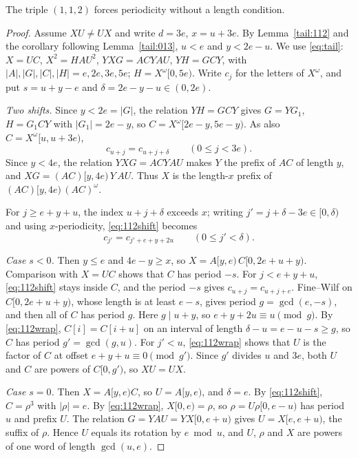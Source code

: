 \begin{theorem}\label{tail:112full}
The triple \((1,1,2)\) forces periodicity without a length condition.
\end{theorem}
\begin{proof}
Assume \(XU\ne UX\) and write \(d=3e\), \(x=u+3e\). By Lemma~\ref{tail:112} and the corollary following Lemma~\ref{tail:013}, \(u<e\) and \(y<2e-u\). We use \eqref{eq:tail}: \(X=UC\), \(X^2=HAU^2\), \(YXG=ACYAU\), \(YH=GCY\), with \(|A|,|G|,|C|,|H|=e,2e,3e,5e\); \(H=X^\omega[0,5e)\). Write \(c_j\) for the letters of \(X^\omega\), and put \(s=u+y-e\) and \(\delta=2e-y-u\in(0,2e)\).

\emph{Two shifts.} Since \(y<2e=|G|\), the relation \(YH=GCY\) gives \(G=YG_1\), \(H=G_1CY\) with \(|G_1|=2e-y\), so \(C=X^\omega[2e-y,5e-y)\). As also \(C=X^\omega[u,u+3e)\),
\begin{equation}\label{eq:112shift}
c_{u+j}=c_{u+j+\delta}\qquad(0\le j<3e).
\end{equation}
Since \(y<4e\), the relation \(YXG=ACYAU\) makes \(Y\) the prefix of \(AC\) of length \(y\), and \(XG=(AC)[y,4e)\,Y\,AU\). Thus \(X\) is the length-\(x\) prefix of \((AC)[y,4e)\,(AC)^\omega\).

For \(j\ge e+y+u\), the index \(u+j+\delta\) exceeds \(x\); writing \(j'=j+\delta-3e\in[0,\delta)\) and using \(x\)-periodicity, \eqref{eq:112shift} becomes
\begin{equation}\label{eq:112wrap}
c_{j'}=c_{j'+e+y+2u}\qquad(0\le j'<\delta).
\end{equation}

\emph{Case \(s<0\).} Then \(y\le e\) and \(4e-y\ge x\), so \(X=A[y,e)\,C[0,2e+u+y)\). Comparison with \(X=UC\) shows that \(C\) has period \(-s\). For \(j<e+y+u\), \eqref{eq:112shift} stays inside \(C\), and the period \(-s\) gives \(c_{u+j}=c_{u+j+e}\). Fine--Wilf on \(C[0,2e+u+y)\), whose length is at least \(e-s\), gives period \(g=\gcd(e,-s)\), and then all of \(C\) has period \(g\). Here \(g\mid u+y\), so \(e+y+2u\equiv u\pmod g\). By \eqref{eq:112wrap}, \(C[i]=C[i+u]\) on an interval of length \(\delta-u=e-u-s\ge g\), so \(C\) has period \(g'=\gcd(g,u)\). For \(j'<u\), \eqref{eq:112wrap} shows that \(U\) is the factor of \(C\) at offset \(e+y+u\equiv0\pmod{g'}\). Since \(g'\) divides \(u\) and \(3e\), both \(U\) and \(C\) are powers of \(C[0,g')\), so \(XU=UX\).

\emph{Case \(s=0\).} Then \(X=A[y,e)C\), so \(U=A[y,e)\), and \(\delta=e\). By \eqref{eq:112shift}, \(C=\rho^3\) with \(|\rho|=e\). By \eqref{eq:112wrap}, \(X[0,e)=\rho\), so \(\rho=U\rho[0,e-u)\) has period \(u\) and prefix \(U\). The relation \(G=YAU=YX[0,e+u)\) gives \(U=X[e,e+u)\), the suffix of \(\rho\). Hence \(U\) equals its rotation by \(e\bmod u\), and \(U\), \(\rho\) and \(X\) are powers of one word of length \(\gcd(u,e)\).


\end{proof}
